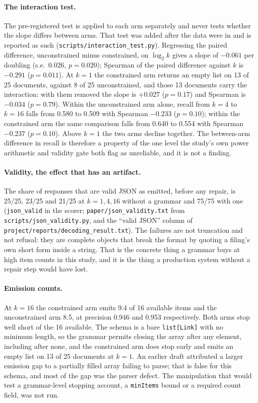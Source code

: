 \documentclass[11pt]{article}
\newcommand{\code}[1]{\texttt{\small #1}}
\begin{document}
\paragraph{The interaction test.} The pre-registered test is applied to each arm
separately and never tests whether the slope differs between arms. That test was
added after the data were in and is reported as such
(\code{scripts/interaction\_test.py}). Regressing the paired difference,
unconstrained minus constrained, on $\log_2 k$ gives a slope of $-0.061$ per
doubling (s.e.\ 0.026, $p = 0.020$); Spearman of the paired difference against
$k$ is $-0.291$ ($p = 0.011$). At $k = 1$ the constrained arm returns an empty
list on 13 of 25 documents, against 8 of 25 unconstrained, and those 13 documents
carry the interaction: with them removed the slope is $+0.027$ ($p = 0.17$) and
Spearman is $-0.034$ ($p = 0.79$). Within the unconstrained arm alone, recall
from $k = 4$ to $k = 16$ falls from 0.580 to 0.509 with Spearman $-0.233$
($p = 0.10$); within the constrained arm the same comparison falls from 0.640 to
0.554 with Spearman $-0.237$ ($p = 0.10$). Above $k = 1$ the two arms decline
together. The between-arm difference in recall is therefore a property of the
one level the study's own power arithmetic and validity gate both flag as
unreliable, and it is not a finding.

\paragraph{Validity, the effect that has an artifact.} The share of responses
that are valid JSON as emitted, before any repair, is 25/25, 23/25 and 21/25 at
$k = 1, 4, 16$ without a grammar and 75/75 with one
(\code{json\_valid} in the scorer; \code{paper/json\_validity.txt} from
\code{scripts/json\_validity.py}, and the ``valid JSON'' column of
\code{project/reports/decoding\_result.txt}). The failures are not truncation
and not refusal: they are complete objects that break the format by quoting a
filing's own short form inside a string. That is the concrete thing a grammar
buys at high item counts in this study, and it is the thing a production system
without a repair step would have lost.

\paragraph{Emission counts.} At $k = 16$ the constrained arm emits 9.4 of 16
available items and the unconstrained arm 8.5, at precision 0.946 and 0.953
respectively. Both arms stop well short of the 16 available. The schema is a bare
\code{list[Link]} with no minimum length, so the grammar permits closing the
array after any element, including after none, and the constrained arm does stop
early and emits an empty list on 13 of 25 documents at $k = 1$. An earlier draft
attributed a larger emission gap to a partially filled array failing to parse;
that is false for this schema, and most of the gap was the parser defect. The
manipulation that would test a grammar-level stopping account, a
\code{minItems} bound or a required count field, was not run.
\end{document}
